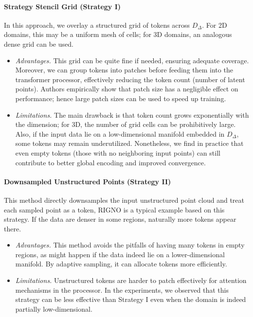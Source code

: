 \documentclass[reqno,10pt]{amsart}
\theoremstyle{plain}
\theoremstyle{definition}
\begin{document}
\paragraph{\bf Strategy Stencil Grid (Strategy I)} In this approach, we overlay a structured grid of tokens across $D_\Delta$. For 2D domains, this may be a uniform mesh of cells; for 3D domains, an analogous dense grid can be used. 
\begin{itemize}\setlength{\itemsep}{0.8em}
    \item {\it Advantages.} This grid can be quite fine if needed, ensuring adequate coverage. Moreover, we can group tokens into patches before feeding them into the transformer processor, effectively reducing the token count (number of latent points). Authors empirically show that patch size has a negligible effect on performance; hence large patch sizes can be used to speed up training.
    \item {\it Limitations.} The main drawback is that token count grows exponentially with the dimension; for 3D, the number of grid cells can be prohibitively large. Also, if the input data lie on a low-dimensional manifold embedded in $D_\Delta$, some tokens may remain underutilized. Nonetheless, we find in practice that even empty tokens (those with no neighboring input points) can still contribute to better global encoding and improved convergence.
\end{itemize}
\paragraph{\bf Downsampled Unstructured Points (Strategy II)} This method directly downsamples the input unstructured point cloud and treat each sampled point as a token, RIGNO \cite{SM2025} is a typical example based on this strategy. If the data are denser in some regions, naturally more tokens appear there.
\begin{itemize} \setlength{\itemsep}{0.8em}
    \item {\it Advantages.} This method avoids the pitfalls of having many tokens in empty regions, as might happen if the data indeed lie on a lower-dimensional manifold. By adaptive sampling, it can allocate tokens more efficiently.
    \item {\it Limitations.} Unstructured tokens are harder to patch effectively for attention mechanisms in the processor. In the experiments, we observed that this strategy can be less effective than Strategy I even when the domain is indeed partially low-dimensional.
\end{itemize}
\end{document}
